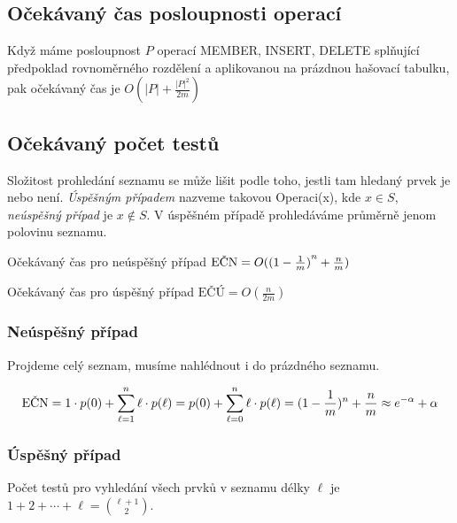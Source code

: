 \def\xx{
s rozptylem
{\bigparens $$ n \cdot \invm (1-\invm) $$}
}

\subsection{Očekávaný čas posloupnosti operací}

Když máme posloupnost $P$ operací MEMBER, INSERT, DELETE splňující
předpoklad rovnoměrného rozdělení a aplikovanou na prázdnou hašovací
tabulku, pak očekávaný čas je \( O( |P| + \frac{|P|^2}{2m} ) \)

\subsection{Očekávaný počet testů}

Složitost prohledání seznamu se může lišit podle toho, jestli tam hledaný
prvek je nebo není. \emph{Úspěšným případem} nazveme takovou Operaci(x), 
kde $x \in S$, \emph{neúspěšný případ} je $x \notin S$. V úspěšném případě
prohledáváme průměrně jenom polovinu seznamu.


Očekávaný čas pro neúspěšný případ 
\( \text{EČN} = O( {(1 - \frac{1}{m})}^n + \frac nm ) \)

Očekávaný čas pro úspěšný případ 
\( \text{EČÚ} = O(\frac n{2m}) \)

\subsubsection{Neúspěšný případ}

Projdeme celý seznam, musíme nahlédnout i do prázdného seznamu.

$$ 
\text{EČN}
= 1 \cdot p(0) + \sum_{\ell=1}^n \ell \cdot p(\ell)
=         p(0) + \sum_{\ell=0}^n \ell \cdot p(\ell)
= (1-\frac{1}{m})^n + \frac nm
\approx e^{-\alpha} + \alpha
$$

\subsubsection{Úspěšný případ}


Počet testů pro vyhledání všech prvků v seznamu délky $\ell$ je\\
$1+2+\cdots+\ell = \binom{\ell+1}{2}$.

